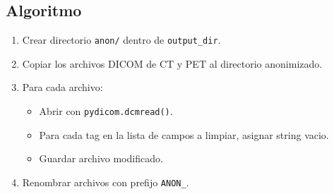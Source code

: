\documentclass[12pt,a4paper]{article}
\begin{document}
\subsection{Algoritmo}

\begin{enumerate}
    \item Crear directorio \texttt{anon/} dentro de \texttt{output\_dir}.
    \item Copiar los archivos DICOM de CT y PET al directorio anonimizado.
    \item Para cada archivo:
          \begin{itemize}
              \item Abrir con \texttt{pydicom.dcmread()}.
              \item Para cada tag en la lista de campos a limpiar, asignar string vacio.
              \item Guardar archivo modificado.
          \end{itemize}
    \item Renombrar archivos con prefijo \texttt{ANON\_}.
\end{enumerate}
\end{document}
